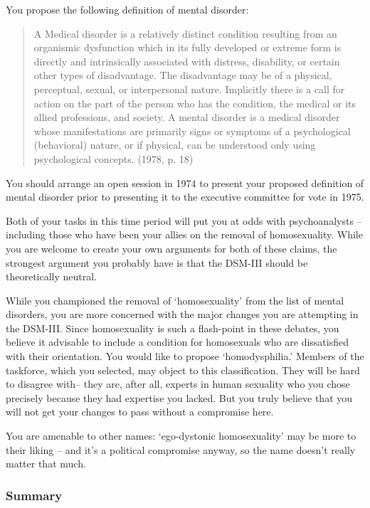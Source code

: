\begin{refsection}
You propose the following definition of mental disorder:

\begin{quote}

A Medical disorder is a relatively distinct condition resulting from an organismic dysfunction which in its fully developed or extreme form is directly and intrinsically associated with distress, disability, or certain other types of disadvantage. The disadvantage may be of a physical, perceptual, sexual, or interpersonal nature. Implicitly there is a call for action on the part of the person who has the condition, the medical or its allied professions, and society.
A mental disorder is a medical disorder whose manifestations are primarily signs or symptoms of a psychological (behavioral) nature, or if physical, can be understood only using psychological concepts. (1978, p. 18)
\end{quote}

You should arrange an open session in 1974 to present your proposed definition of mental disorder prior to presenting it to the executive committee for vote in 1975.

Both of your tasks in this time period will put you at odds with psychoanalysts – including those who have been your allies on the removal of homosexuality. While you are welcome to create your own arguments for both of these claims, the strongest argument you probably have is that the DSM-III should be theoretically neutral. 

While you championed the removal of `homosexuality' from the list of mental disorders, you are more concerned with the major changes you are attempting in the DSM-III. Since homosexuality is such a flash-point in these debates, you believe it advisable to include a condition for homosexuals who are dissatisfied with their orientation. You would like to propose `homodysphilia.' Members of the taskforce, which you selected, may object to this classification. They will be hard to disagree with-- they are, after all, experts in human sexuality who you chose precisely because they had expertise you lacked. But you truly believe that you will not get your changes to pass without a compromise here.

You are amenable to other names: `ego-dystonic homosexuality' may be more to their liking – and it's a political compromise anyway, so the name doesn't really matter that much.

\subsubsection{Summary}
\label{summary}


\end{refsection}

